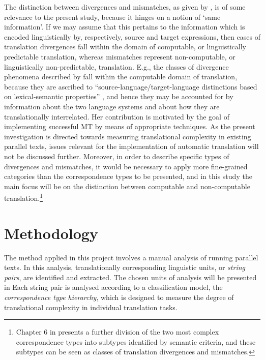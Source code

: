 \documentclass[output=paper]{LSP/langsci}
\begin{document}
The distinction between divergences and mismatches, as given by \citet{BarnettEtAl1991}, is of some relevance to the present study, because it hinges on a notion of `same information'. If we may assume that this pertains to the information which is encoded linguistically by, respectively, source and target expressions, then cases of translation divergences fall within the domain of computable, or linguistically predictable translation, whereas mismatches represent non-computable, or linguistically non-predictable, translation. E.g., the classes of divergence phenomena described by \citet{Dorr1994} fall within the computable domain of translation, because they are ascribed to ``source-language/target-language distinctions based on lexical-semantic properties'' \citep[599]{Dorr1994}, and hence they may be accounted for by information about the two language systems and about how they are translationally interrelated. Her contribution is motivated by the goal of implementing successful MT by means of appropriate techniques. As the present investigation is directed towards measuring translational complexity in existing parallel texts, issues relevant for the implementation of automatic translation will not be discussed further. Moreover, in order to describe specific types of divergences and mismatches, it would be necessary to apply more fine-grained categories than the correspondence types to be presented, and in this study the main focus will be on the distinction between computable and non-computable translation.\footnote{Chapter 6 in \citet{Thunes2011} presents a further division of the two most complex correspondence types into subtypes identified by semantic criteria, and these subtypes can be seen as classes of translation divergences and mismatches.}

\section{Methodology}\label{sec:thunes:3}

The method applied in this project involves a manual analysis of running parallel texts. In this analysis, translationally corresponding linguistic units, or \textit{string pairs}, are identified and extracted. The chosen units of analysis will be presented in  Each string pair is analysed according to a classification model, the \textit{correspondence type hierarchy}, which is designed to measure the degree of translational complexity in individual translation tasks.
\end{document}
